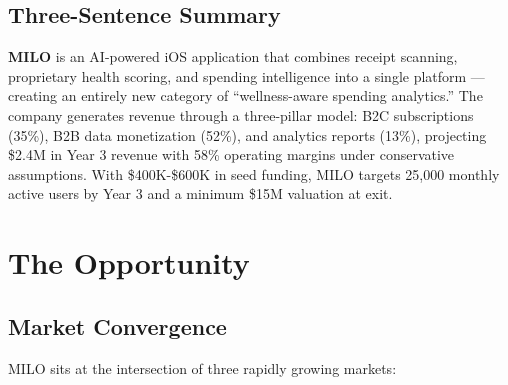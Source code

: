 \documentclass[11pt,a4paper]{article}
\begin{document}
\subsection{Three-Sentence Summary}

\textbf{MILO} is an AI-powered iOS application that combines receipt scanning, proprietary health scoring, and spending intelligence into a single platform --- creating an entirely new category of ``wellness-aware spending analytics.'' The company generates revenue through a three-pillar model: B2C subscriptions (35\%), B2B data monetization (52\%), and analytics reports (13\%), projecting \$2.4M in Year 3 revenue with 58\% operating margins under conservative assumptions. With \$400K-\$600K in seed funding, MILO targets 25,000 monthly active users by Year 3 and a minimum \$15M valuation at exit.

\newpage

\section{The Opportunity}

\subsection{Market Convergence}

MILO sits at the intersection of three rapidly growing markets:

\begin{center}
\end{center}
\end{document}
